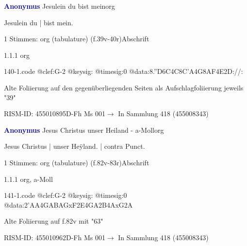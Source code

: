 \documentclass[twocolumn, 12pt]{book}
\begin{document}
\par \vspace{16pt} \textcolor{darkblue}{\textbf{Anonymus  }}\hfillplus{\textbf{[140]}}\newline Jesulein du bist mein\newline org
\par \begin{itshape}[f.39v, at left:] Jesulein du | bist mein.\end{itshape} 
\par \textcolor{darkblue}{}  1 Stimmen: org (tabulature)  (f.39v-40r)\newline Abschrift
\par 1.1.1  org  
\begin{filecontents*}{140-1.code}
@clef:G-2
@keysig:
@timesig:0
@data:8.''D6C4C{8C'A}4G{8AF}4E2D://:
\end{filecontents*}
\newline %
\par Alte Foliierung auf den gegenüberliegenden Seiten als Aufschlagfoliierung jeweils "39"
\par RISM-ID: 455010895\newline D-Fh  Ms 001\newline $\rightarrow$ In Sammlung 418 (455008343)
      
\par \vspace{16pt} \textcolor{darkblue}{\textbf{Anonymus  }}\hfillplus{\textbf{[141]}}\newline Jesus Christus unser Heiland - a-Moll\newline org
\par \begin{itshape}[f.82v, at left:] Jesus Christus | unser Heÿland. | contra Punct.\end{itshape} 
\par \textcolor{darkblue}{}  1 Stimmen: org (tabulature)  (f.82v-83r)\newline Abschrift
\par 1.1.1  org, a-Moll  
\begin{filecontents*}{141-1.code}
@clef:G-2
@keysig:
@timesig:0
@data:2'AA4GABAGxF2E4GA2B4AxG2A
\end{filecontents*}
\newline %
\par Alte Foliierung auf f.82v mit "63"
\par RISM-ID: 455010962\newline D-Fh  Ms 001\newline $\rightarrow$ In Sammlung 418 (455008343)
      
\end{document}
